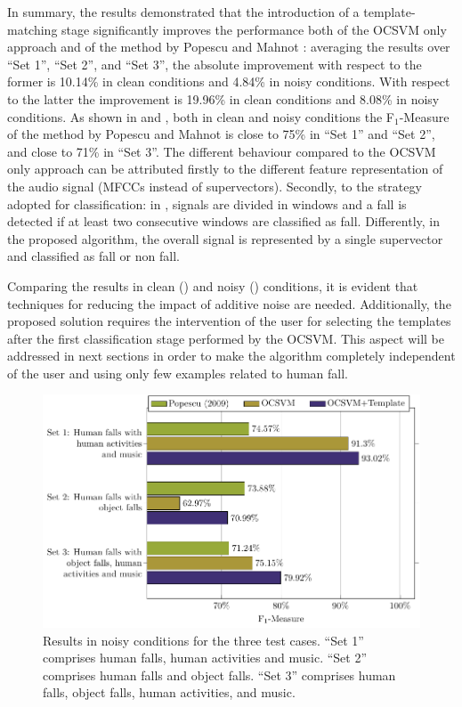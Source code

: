 In summary, the results demonstrated that the introduction of a template-matching stage significantly improves the performance both of the OCSVM only approach and of the method by Popescu and Mahnot \cite{Popescu2009}: averaging the results over ``Set 1'', ``Set 2'', and ``Set 3'', the absolute improvement with respect to the former is 10.14\% in clean conditions and 4.84\% in noisy conditions. With respect to the latter \cite{Popescu2009} the improvement is 19.96\% in clean conditions and 8.08\% in noisy conditions. As shown in  and , both in clean and noisy conditions the F$_1$-Measure of the method by Popescu and Mahnot \cite{Popescu2009} is close to 75\% in ``Set 1'' and ``Set 2'', and close to 71\% in ``Set 3''. The different behaviour compared to the OCSVM only approach can be attributed firstly to the different feature representation of the audio signal (MFCCs instead of supervectors). Secondly, to the strategy adopted for classification: in \cite{Popescu2009}, signals are divided in windows and a fall is detected if at least two consecutive windows are classified as fall. Differently, in the proposed algorithm, the overall signal is represented by a single supervector and classified as fall or non fall.

Comparing the results in clean () and noisy () conditions, it is evident that techniques for reducing the impact of additive noise are needed. Additionally, the proposed solution requires the intervention of the user for selecting the templates after the first classification stage performed by the OCSVM. This aspect will be addressed in next sections in order to make the algorithm completely independent of the user and using only few examples related to human fall.

\begin{figure}[htb]
	\centering
	\includegraphics[width=\columnwidth]{img/cin/res_noisy.pdf}
	\caption{Results in noisy conditions for the three test cases. ``Set 1'' comprises human falls, human activities and music. ``Set 2'' comprises human falls and object falls. ``Set 3'' comprises human falls, object falls, human activities, and music.} \label{fig:res_noisy_}
\end{figure}


